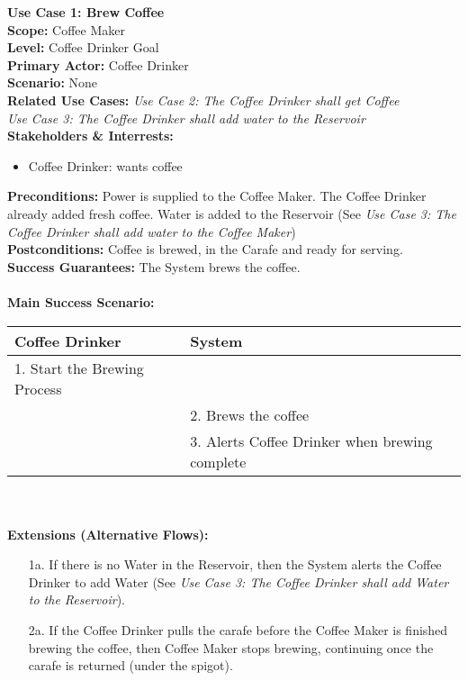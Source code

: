 \documentclass[letterpaper]{article}
\begin{document}
\noindent
\textbf{Use Case 1: Brew Coffee}\\
\textbf{Scope: }Coffee Maker\\
\textbf{Level: }Coffee Drinker Goal\\
\textbf{Primary Actor: }Coffee Drinker\\
\textbf{Scenario: }None\\
\textbf{Related Use Cases: }\textit{Use Case 2:  The Coffee Drinker
shall get Coffee}\\\textit{Use Case 3:  The Coffee Drinker shall add
water to the Reservoir}\\
\textbf{Stakeholders \& Interrests: }
\begin{itemize}
\item Coffee Drinker: wants coffee
\end{itemize}
\textbf{Preconditions: }Power is supplied to the Coffee Maker.
The Coffee Drinker already added fresh coffee. Water is added to the
Reservoir (See \textit{Use Case 3:  The Coffee Drinker shall add water
to the Coffee Maker})\\
\textbf{Postconditions: }Coffee is brewed, in the Carafe and ready for
serving.\\
\textbf{Success Guarantees: }The System brews the coffee.\\\\
\textbf{Main Success Scenario: }\\
\begin{tabular}{|p{5.75cm}|p{5.75cm}|}\hline
\textbf{Coffee Drinker} & \textbf{System}\\\hline
1.  Start the Brewing Process &\\\hline
& 2. Brews the coffee\\\hline
& 3. Alerts Coffee Drinker when brewing complete\\\hline
\end{tabular}\\\\
\textbf{Extensions (Alternative Flows): }
\begin{itemize}
\item[1a.]
If there is no Water in the Reservoir, then the System alerts the
Coffee Drinker to add Water (See \textit{Use Case 3:  The Coffee
Drinker shall add Water to the Reservoir}).
\item[2a.]
If the Coffee Drinker pulls the carafe before the Coffee Maker
is finished brewing the coffee, then Coffee Maker stops brewing,
continuing once the carafe is returned (under the spigot).
\end{itemize}
\end{document}
